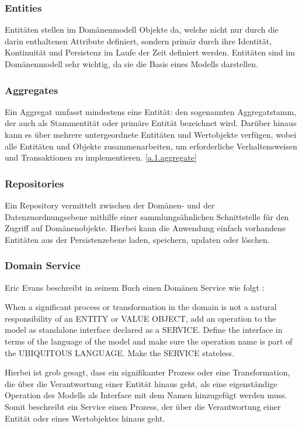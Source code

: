 			\subsubsection{Entities \cite{domainModell.microsoft}} \label{1.ent}
			Entitäten stellen im Domänenmodell Objekte da, welche nicht nur durch die darin enthaltenen Attribute definiert, sondern primär durch ihre Identität, Kontinuität und Persistenz im Laufe der Zeit definiert werden. Entitäten sind im Domänenmodell sehr wichtig, da sie die Basis eines Modells darstellen.
			
			\subsubsection{Aggregates \cite{domainModell.microsoft}} \label{1.aggregates}
			Ein Aggregat umfasst mindestens eine Entität: den sogenannten Aggregatstamm, der auch als Stammentität oder primäre Entität bezeichnet wird. Darüber hinaus kann es über mehrere untergeordnete Entitäten und Wertobjekte verfügen, wobei alle Entitäten und Objekte zusammenarbeiten, um erforderliche Verhaltensweisen und Transaktionen zu implementieren. \cref{a.1.aggregate}
			
			\subsubsection{Repositories \cite{repository.medium}}
			Ein Repository vermittelt zwischen der Domänen- und der Datenzuordnungsebene mithilfe einer sammlungsähnlichen Schnittstelle für den Zugriff auf Domänenobjekte. Hierbei kann die Anwendung einfach vorhandene Entitäten aus der Persistenzebene laden, speichern, updaten oder löschen.
			
			\subsubsection{Domain Service \cite{domainService.gorodinski}}
			Eric Evans beschreibt in seinem Buch  einen Domänen Service wie folgt : 
			\begin{displayquote}
				When a significant process or transformation in the domain is not a natural responsibility of an ENTITY or VALUE OBJECT, add an operation to the model as standalone interface declared as a SERVICE. Define the interface in terms of the language of the model and make sure the operation name is part of the UBIQUITOUS LANGUAGE. Make the SERVICE stateless.
			\end{displayquote}
			Hierbei ist grob gesagt, dass ein signifikanter Prozess oder eine Transformation, die über die Verantwortung einer Entität hinaus geht, als eine eigenständige Operation des Modells als Interface mit dem Namen  hinzugefügt werden muss. Somit beschreibt ein Service einen Prozess, der über die Verantwortung einer Entität oder eines Wertobjektes hinaus geht.
		
